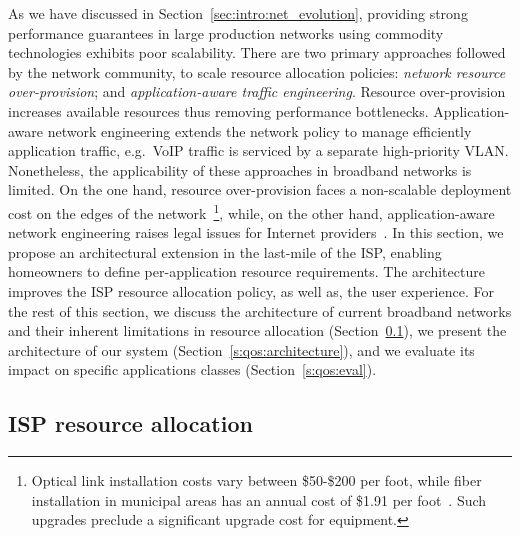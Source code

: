 As we have discussed in Section~\ref{sec:intro:net_evolution}, providing strong
performance guarantees in large production networks using commodity technologies
exhibits poor scalability. There are two primary approaches followed by the network
community, to scale resource allocation policies: \emph{network resource
  over-provision}; and \emph{application-aware traffic engineering}.  Resource
over-provision increases available resources thus removing performance
bottlenecks. Application-aware network engineering extends the network
policy to  manage efficiently application traffic, e.g.~VoIP traffic is serviced
by a separate high-priority VLAN\@. Nonetheless, the applicability of these
approaches in broadband networks is limited. On the one hand, resource
over-provision faces a non-scalable deployment cost on the edges of the
network~\footnote{Optical link installation costs vary between \$50-\$200 per
  foot, while fiber installation in municipal areas has an annual cost of \$1.91
  per foot~. Such upgrades preclude a significant upgrade
  cost for equipment.}, while, on the other hand, application-aware network
engineering raises legal issues for Internet providers~. In this
section, we propose an architectural extension in the last-mile of the ISP,
enabling homeowners to define per-application resource requirements.  The
architecture improves the ISP resource allocation policy, as well as, the user
experience.  For the rest of this section, we discuss the architecture of
current broadband networks and their  inherent limitations in resource allocation
(Section~\ref{s:qos:motivation}), we present the architecture of our
system (Section~\ref{s:qos:architecture}), and we evaluate its impact on specific
applications classes (Section~\ref{s:qos:eval}).

\subsection{ISP resource allocation} \label{s:qos:motivation}

